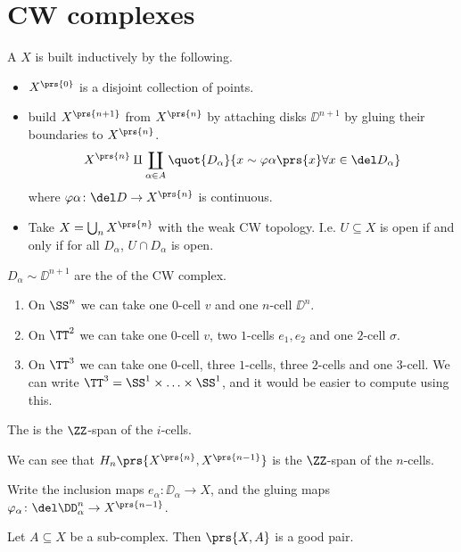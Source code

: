 \documentclass[10pt,a4paper,twoside,openany,hidelinks]{book}
\begin{document}
\section{CW complexes}
\begin{definition}
A  $X$ is built inductively by the following.
\begin{itemize}
\item $X^{\prs{0}}$ is a disjoint collection of points.
\item build $X^{\prs{n+1}}$ from $X^{\prs{n}}$ by attaching disks $\DD^{n+1}$ by gluing their boundaries to $X^{\prs{n}}$.
\[X^{\prs{n}} \amalg \coprod_{\alpha \in A} \quot{D_{\alpha}}{x \sim \varphi{\alpha}\prs{x} \forall x \in \del D_{\alpha}}\]
where $\varphi{\alpha} \colon \del D \to X^{\prs{n}}$ is continuous.
\item Take $X = \bigcup_n X^{\prs{n}}$ with the weak CW topology. I.e. $U \subseteq X$ is open if and only if for all $D_{\alpha}$, $U \cap D_{\alpha}$ is open.
\end{itemize}
\end{definition}
\begin{definition}
$D_{\alpha} \sim \DD^{n+1}$ are the  of the CW complex.
\end{definition}
\begin{examples}
\begin{enumerate}
\item On $\SS^n$ we can take one $0$-cell $v$ and one $n$-cell $\DD^n$.
\item On $\TT^2$ we can take one $0$-cell $v$, two $1$-cells $e_1, e_2$ and one $2$-cell $\sigma$.
\item On $\TT^3$ we can take one $0$-cell, three $1$-cells, three $2$-cells and one $3$-cell.
We can write $\TT^3 = \SS^1 \times \ldots \times \SS^1$, and it would be easier to compute using this.
\end{enumerate}
\end{examples}
\begin{definition}
The  is the $\ZZ$-span of the $i$-cells. 
\end{definition}
\begin{remark}
We can see that $H_n\prs{X^{\prs{n}}, X^{\prs{n-1}}}$ is the $\ZZ$-span of the $n$-cells.
\end{remark}
\begin{notation}
Write the inclusion maps $e_{\alpha} \colon \DD_{\alpha} \to X$, and the gluing maps $\varphi_{\alpha} \colon \del \DD^n_{\alpha} \to X^{\prs{n-1}}$.
\end{notation}
\begin{fact}
Let $A \subseteq X$ be a sub-complex. Then $\prs{X,A}$ is a good pair.
\end{fact}
\end{document}
